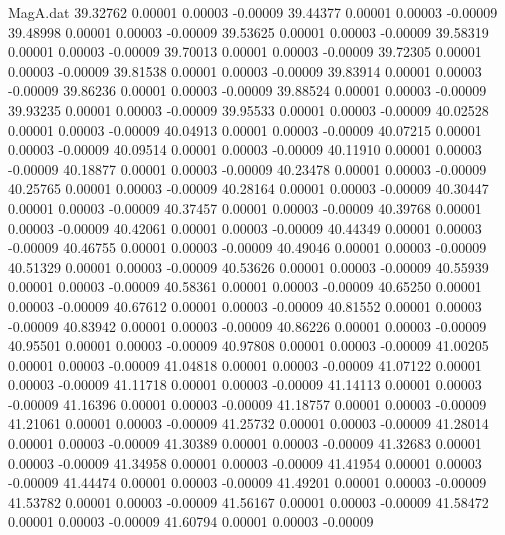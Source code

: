 \begin{filecontents}{MagA.dat}
  39.32762    0.00001    0.00003   -0.00009
  39.44377    0.00001    0.00003   -0.00009
  39.48998    0.00001    0.00003   -0.00009
  39.53625    0.00001    0.00003   -0.00009
  39.58319    0.00001    0.00003   -0.00009
  39.70013    0.00001    0.00003   -0.00009
  39.72305    0.00001    0.00003   -0.00009
  39.81538    0.00001    0.00003   -0.00009
  39.83914    0.00001    0.00003   -0.00009
  39.86236    0.00001    0.00003   -0.00009
  39.88524    0.00001    0.00003   -0.00009
  39.93235    0.00001    0.00003   -0.00009
  39.95533    0.00001    0.00003   -0.00009
  40.02528    0.00001    0.00003   -0.00009
  40.04913    0.00001    0.00003   -0.00009
  40.07215    0.00001    0.00003   -0.00009
  40.09514    0.00001    0.00003   -0.00009
  40.11910    0.00001    0.00003   -0.00009
  40.18877    0.00001    0.00003   -0.00009
  40.23478    0.00001    0.00003   -0.00009
  40.25765    0.00001    0.00003   -0.00009
  40.28164    0.00001    0.00003   -0.00009
  40.30447    0.00001    0.00003   -0.00009
  40.37457    0.00001    0.00003   -0.00009
  40.39768    0.00001    0.00003   -0.00009
  40.42061    0.00001    0.00003   -0.00009
  40.44349    0.00001    0.00003   -0.00009
  40.46755    0.00001    0.00003   -0.00009
  40.49046    0.00001    0.00003   -0.00009
  40.51329    0.00001    0.00003   -0.00009
  40.53626    0.00001    0.00003   -0.00009
  40.55939    0.00001    0.00003   -0.00009
  40.58361    0.00001    0.00003   -0.00009
  40.65250    0.00001    0.00003   -0.00009
  40.67612    0.00001    0.00003   -0.00009
  40.81552    0.00001    0.00003   -0.00009
  40.83942    0.00001    0.00003   -0.00009
  40.86226    0.00001    0.00003   -0.00009
  40.95501    0.00001    0.00003   -0.00009
  40.97808    0.00001    0.00003   -0.00009
  41.00205    0.00001    0.00003   -0.00009
  41.04818    0.00001    0.00003   -0.00009
  41.07122    0.00001    0.00003   -0.00009
  41.11718    0.00001    0.00003   -0.00009
  41.14113    0.00001    0.00003   -0.00009
  41.16396    0.00001    0.00003   -0.00009
  41.18757    0.00001    0.00003   -0.00009
  41.21061    0.00001    0.00003   -0.00009
  41.25732    0.00001    0.00003   -0.00009
  41.28014    0.00001    0.00003   -0.00009
  41.30389    0.00001    0.00003   -0.00009
  41.32683    0.00001    0.00003   -0.00009
  41.34958    0.00001    0.00003   -0.00009
  41.41954    0.00001    0.00003   -0.00009
  41.44474    0.00001    0.00003   -0.00009
  41.49201    0.00001    0.00003   -0.00009
  41.53782    0.00001    0.00003   -0.00009
  41.56167    0.00001    0.00003   -0.00009
  41.58472    0.00001    0.00003   -0.00009
  41.60794    0.00001    0.00003   -0.00009

\end{filecontents}
